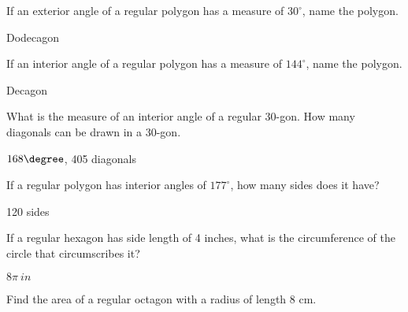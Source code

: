 \begin{exercises}

	\begin{ex} \e If an exterior angle of a regular polygon has a measure of $30^\circ$, name the polygon.
	
	\begin{sol}
	Dodecagon
	\end{sol}
	\end{ex}
	
	\medskip
	
	\begin{ex} \e If an interior angle of a regular polygon has a measure of $144^\circ$, name the polygon.
	
	\begin{sol}
	Decagon
	\end{sol}
	\end{ex}
	
	\medskip
	
	\begin{ex}  What is the measure of an interior angle of a regular 30-gon.  How many diagonals can be drawn in a 30-gon.
	
	\begin{sol}
	$168\degree$, 405 diagonals
	\end{sol}
	\end{ex}
	
	\medskip
	
	\begin{ex} \e If a regular polygon has interior angles of $177^\circ$, how many sides does it have?
	
	\begin{sol}
	120 sides
	\end{sol}
	\end{ex}
	
	\medskip
	
	\begin{ex}  If a regular hexagon has side length of 4 inches, what is the circumference of the circle that circumscribes it?
	
	\begin{sol}
	$8\pi~in$
	\end{sol}
	\end{ex}
	
	\medskip
		
	\begin{ex} \e Find the area of a regular octagon with a radius of length 8 cm.

\begin{flushright}
\begin{tikzpicture}


\end{tikzpicture}
\end{flushright}
\end{ex}
\end{exercises}
